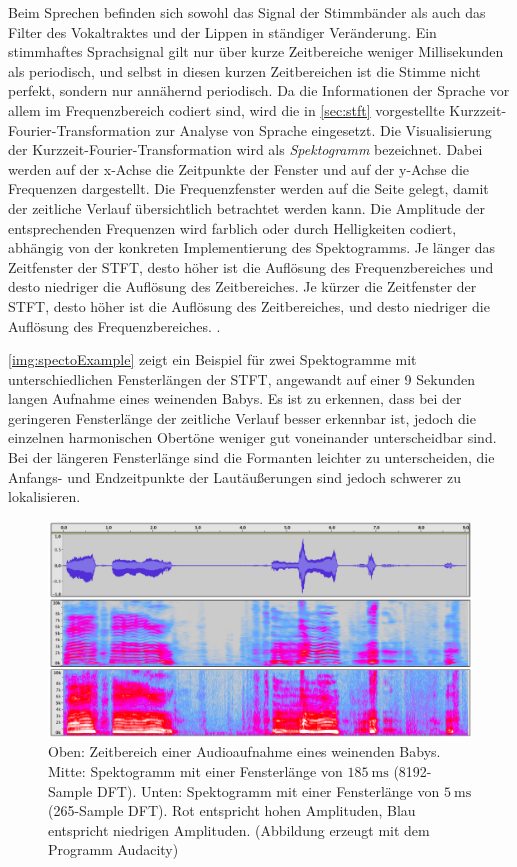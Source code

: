 Beim Sprechen befinden sich sowohl das Signal der Stimmbänder als auch das Filter des Vokaltraktes und der Lippen in ständiger Veränderung. Ein stimmhaftes Sprachsignal gilt nur über kurze Zeitbereiche weniger Millisekunden als periodisch, und selbst in diesen kurzen Zeitbereichen ist die Stimme nicht perfekt, sondern nur annähernd periodisch. Da die Informationen der Sprache vor allem im Frequenzbereich codiert sind, wird die in \autoref{sec:stft} vorgestellte Kurzzeit-Fourier-Transformation zur Analyse von Sprache eingesetzt. Die Visualisierung der Kurzzeit-Fourier-Transformation wird als \emph{Spektogramm} bezeichnet. Dabei werden auf der x-Achse die Zeitpunkte der Fenster und auf der y-Achse die Frequenzen dargestellt. Die Frequenzfenster werden \glqq auf die Seite gelegt\grqq{}, damit der zeitliche Verlauf übersichtlich betrachtet werden kann. Die Amplitude der entsprechenden Frequenzen wird farblich oder durch Helligkeiten codiert, abhängig von der konkreten Implementierung des Spektogramms. Je länger das Zeitfenster der STFT, desto höher ist die Auflösung des Frequenzbereiches und desto niedriger die Auflösung des Zeitbereiches. Je kürzer die Zeitfenster der STFT, desto höher ist die Auflösung des Zeitbereiches, und desto niedriger die Auflösung des Frequenzbereiches.\cite[S. 45 - 50]{sprachverarbeitung} \cite[\emph{Acoustic Representations of Speech}]{speechAcoustics}.

\autoref{img:spectoExample} zeigt ein Beispiel für zwei Spektogramme mit unterschiedlichen Fensterlängen der STFT, angewandt auf einer 9 Sekunden langen Aufnahme eines weinenden Babys. Es ist zu erkennen, dass bei der geringeren Fensterlänge der zeitliche Verlauf besser erkennbar ist, jedoch die einzelnen harmonischen Obertöne weniger gut voneinander unterscheidbar sind. Bei der längeren Fensterlänge sind die Formanten leichter zu unterscheiden, die Anfangs- und Endzeitpunkte der Lautäußerungen sind jedoch schwerer zu lokalisieren.

\begin{figure}[H]
	\centering
	\includegraphics[width=1\textwidth]{bilder/spectogram03.png}
	\caption[Spektogramm einer Audioaufnahme eines Babys]{Oben: Zeitbereich einer Audioaufnahme eines weinenden Babys. Mitte: Spektogramm mit einer Fensterlänge von $\SI{185}{\milli\second}$ (8192-Sample DFT). Unten: Spektogramm mit einer Fensterlänge von $\SI{5}{\milli\second}$ (265-Sample DFT). Rot entspricht hohen Amplituden, Blau entspricht niedrigen Amplituden. (Abbildung erzeugt mit dem Programm \glqq Audacity\grqq)}
	\label{img:spectoExample}
\end{figure}	

